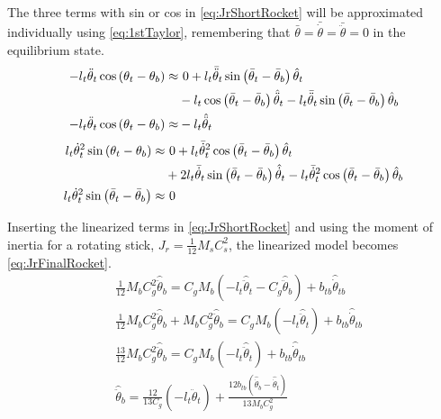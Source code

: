 		The three terms with sin or cos in \vref{eq:JrShortRocket} will be approximated individually using \vref{eq:1stTaylor}, remembering that $\bar{\theta}=\bar{\dot{\theta}}=\bar{\ddot{\theta}}=0$ in the equilibrium state.
		\begin{subequations}
			\begin{flalign}
				-l_t\ddot{\theta}_t\cos\left(\theta_t-\theta_b\right)  \approx & \ 0 + l_t\bar{\ddot{\theta}}_t\sin\left(\bar{\theta}_t-\bar{\theta}_b\right)\hat{\theta}_t  \notag \\ 
				& -l_t\cos\left(\bar{\theta}_t-\bar{\theta}_b\right)\hat{\ddot{\theta}}_t - l_t\bar{\ddot{\theta}}_t\sin\left(\bar{\theta}_t-\bar{\theta}_b\right)\hat{\theta}_b   \\
				-l_t\ddot{\theta}_t\cos\left(\theta_t-\theta_b\right) \approx &-l_t\hat{\ddot{\theta}}_t 
			\end{flalign} %
		\end{subequations}
		\begin{subequations}
			\begin{flalign}
				l_t\dot{\theta}_t^2\sin\left(\theta_t-\theta_b\right)  \approx &\ 0 + l_t\bar{\dot{\theta}}_t^2\cos\left(\bar{\theta}_t-\bar{\theta}_b\right)\hat{\theta}_t  \notag \\
				& + 2l_t\bar{\dot{\theta}}_t\sin\left(\bar{\theta}_t-\bar{\theta}_b\right)\hat{\dot{\theta}}_t-l_t\bar{\dot{\theta}}_t^2\cos\left(\bar{\theta}_t-\bar{\theta}_b\right)\hat{\theta}_b   \\
				l_t\dot{\theta}_t^2\sin\left(\bar{\theta}_t-\bar{\theta}_b\right) \approx & \ 0 
			\end{flalign}
		\end{subequations}
		
		Inserting the linearized terms in \vref{eq:JrShortRocket} and using the moment of inertia for a rotating stick, $J_r=\frac{1}{12}M_sC_s^2$, the linearized model becomes \eqref{eq:JrFinalRocket}.
		\begin{subequations}
			\begin{flalign}
				& \frac{1}{12}M_bC_g^2\hat{\ddot{\theta}}_b=C_g M_b\left(-l_t\hat{\ddot{\theta}}_t-C_g\hat{\ddot{\theta}}_b\right)+b_{tb}\hat{\dot{\theta}}_{tb}   \\
				& \frac{1}{12}M_bC_g^2\hat{\ddot{\theta}}_b+M_bC_g^2\hat{\ddot{\theta}}_b=C_gM_b\left(-l_t\hat{\ddot{\theta}}_t\right)+b_{tb}\hat{\dot{\theta}}_{tb}   \\
				& \frac{13}{12}M_bC_g^2\hat{\ddot{\theta}}_b=C_gM_b\left(-l_t\hat{\ddot{\theta}}_t\right)+b_{tb}\hat{\dot{\theta}}_{tb}  \label{eq:TauSmLin} \\
				& \hat{\ddot{\theta}}_b=\frac{12}{13C_g}\left(-l_t\hat{\ddot{\theta}}_t\right)+\frac{12b_{tb}\left(\hat{\dot{\theta}}_b-\hat{\dot{\theta}}_t\right)}{13M_bC_g^2} \label{eq:JrFinalRocket}
			\end{flalign}
		\end{subequations}
		
